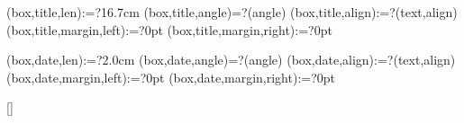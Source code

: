 \spine(box,title,len):=?{16.7cm}
\spine(box,title,angle)=?{\thespine(angle)}
\spine(box,title,align):=?{\thespine(text,align)}
\spine(box,title,margin,left):=?{0pt}
\spine(box,title,margin,right):=?{0pt}

\spine(box,date,len):=?{2.0cm}
\spine(box,date,angle)=?{\thespine(angle)}
\spine(box,date,align):=?{\thespine(text,align)}
\spine(box,date,margin,left):=?{0pt}
\spine(box,date,margin,right):=?{0pt}



\newif\ifisdim
\newcommand{\@setifisdim}[1]{%
  \StrLeft{#1}{1}[\@dimleft]%
  \StrRight{#1}{1}[\@dimright]%
  \IfInteger{\@dimleft}{%
    \IfInteger{\@dimright}{%
      \isdimfalse%
    }{%
      \isdimtrue%
    }%
  }{%
    \isdimfalse%
  }%
}
\newcommand{\IfIsDim}[3]{%
  \@setifisdim{#1}%
  \ifisdim#2\else#3\fi%
}


\newlength{\@spinelen}  %
\newlength{\@spineboxlen} %
\newlength{\@spinefixedlen} %
\newlength{\@spinevarlen} %
\newlength{\@spineboxseplen} %
\newlength{\@spinelr} %
\newlength{\@spinevar} %
[\@spineNBoxes]%


\newcommand{\@getspinelen}{%
  \setlength{\@spinelr}{\dimexpr\thespine(margin,left)+\thespine(margin,right)\relax}%
  \setlength{\@spineboxseplen}{\dimexpr \thespine(boxsep)*3\relax}%
  \setlength{\@spinefixedlen}{\dimexpr \@spinelr+\@spineboxseplen\relax}
  \setlength{\@spineboxlen}{0pt}
  \setlength{\@spinevarlen}{0pt}
  \@for\myi:=\expanded{\thespine(order)}\do{%
    \@tempdima=\dimexpr \thespine(box,\myi,len)\relax%
    \spine(box,\myi,len):={\the\@tempdima}
    \addtolength{\@spineboxlen}{\@tempdima}
    \ifdatadefined{spine}(box,\myi,len){%
      \addtolength{\@spinefixedlen}{\@tempdima}
    }{%
      \addtolength{\@spinevarlen}{\@tempdima}
    }%
  }%
  \setlength{\@spinelen}{\dimexpr \@spinefixedlen+\@spinevarlen\relax}
}

